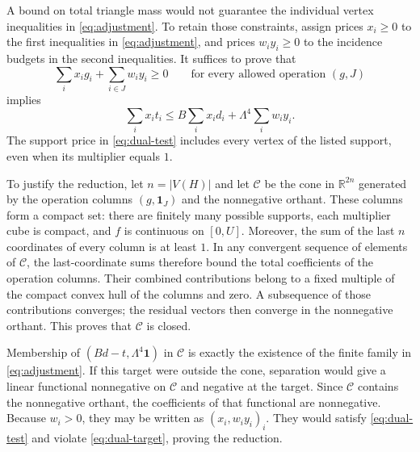 A bound on total triangle mass would not guarantee the individual
vertex inequalities in \eqref{eq:adjustment}.  To retain those
constraints, assign prices $x_i\ge0$ to the first inequalities in
\eqref{eq:adjustment}, and prices $w_i y_i\ge0$ to the incidence
budgets in the second inequalities.  It suffices to prove that
\begin{equation}
\label{eq:dual-test}
 \sum_i x_i g_i+\sum_{i\in J}w_i y_i\ge0
 \qquad\text{for every allowed operation $(g,J)$}
\end{equation}
implies
\begin{equation}
\label{eq:dual-target}
 \sum_i x_i t_i\le B\sum_i x_i d_i
                         +\Lambda^4\sum_i w_i y_i.
\end{equation}
The support price in \eqref{eq:dual-test} includes every vertex of the
listed support, even when its multiplier equals $1$.

To justify the reduction, let $n=|V(H)|$ and let $\mathcal C$ be the
cone in $\mathbb R^{2n}$ generated by the operation columns
$(g,\mathbf1_J)$ and the nonnegative orthant.  These columns form a
compact set: there are finitely many possible supports, each multiplier
cube is compact, and $f$ is continuous on $[0,U]$.  Moreover, the sum
of the last $n$ coordinates of every column is at least $1$.  In any
convergent sequence of elements of $\mathcal C$, the last-coordinate
sums therefore bound the total coefficients of the operation columns.
Their combined contributions belong to a fixed multiple of the compact
convex hull of the columns and zero.  A subsequence of those
contributions converges; the residual vectors then converge in the
nonnegative orthant.  This proves that $\mathcal C$ is closed.

Membership of $(Bd-t,\Lambda^4\mathbf1)$ in $\mathcal C$ is exactly
the existence of the finite family in \eqref{eq:adjustment}.  If this
target were outside the cone, separation would give a linear functional
nonnegative on $\mathcal C$ and negative at the target.  Since
$\mathcal C$ contains the nonnegative orthant, the coefficients of
that functional are nonnegative.  Because $w_i>0$, they may be written
as $(x_i,w_i y_i)_i$.  They would satisfy \eqref{eq:dual-test} and
violate \eqref{eq:dual-target}, proving the reduction.

